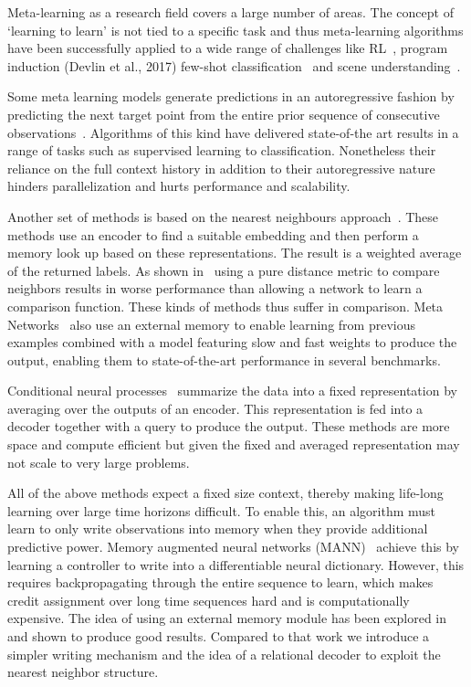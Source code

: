 \documentclass{article} \usepackage{iclr2019_conference,times}
\begin{document}
Meta-learning as a research field covers a large number of areas. The concept of ‘learning to learn’ is not tied to a specific task and thus meta-learning algorithms have been successfully applied to a wide range of challenges like RL~\citep{wang2016learning, finn2017model}, program induction (Devlin et al., 2017) few-shot classification~\citep{koch2015siamese, vinyals2016matching} and scene understanding~\citep{eslami2018neural}.

Some meta learning models generate predictions in an autoregressive fashion by predicting the next target point from the entire prior sequence of consecutive observations~\citep{reed2018fewshot, mishra2018a}. Algorithms of this kind have delivered state-of-the art results in a range of tasks such as supervised learning to classification. Nonetheless their reliance on the full context history in addition to their autoregressive nature hinders parallelization and hurts performance and scalability.

Another set of methods is based on the nearest neighbours approach~\citep{koch2015siamese, vinyals2016matching, snell2017prototypical}. These methods use an encoder to find a suitable embedding and then perform a memory look up based on these representations. The result is a weighted average of the returned labels. As shown in~\citep{mishra2018a} using a pure distance metric to compare neighbors results in worse performance than allowing a network to learn a comparison function. These kinds of methods thus suffer in comparison. Meta Networks~\citep{munkhdalai2017meta} also use an external memory to enable learning from previous examples combined with a model featuring slow and fast weights to produce the output, enabling them to state-of-the-art performance in several benchmarks.  

Conditional neural processes~\citep{garnelo2018conditional} summarize the data into a fixed representation by averaging over the outputs of an encoder. This representation is fed into a decoder together with a query to produce the output. These methods are more space and compute efficient but given the fixed and averaged representation may not scale to very large problems.

All of the above methods expect a fixed size context, thereby making life-long learning over large time horizons difficult. To enable this, an algorithm must learn to only write observations into memory when they provide additional predictive power. Memory augmented neural networks (MANN)~\citep{santoro2016meta} achieve this by learning a controller to write into a differentiable neural dictionary. However, this requires backpropagating through the entire sequence to learn, which makes credit assignment over long time sequences hard and is computationally expensive. The idea of using an external memory module has been explored in~\citep{kaiser2017learning} and shown to produce good results. Compared to that work we introduce a simpler writing mechanism and the idea of a relational decoder to exploit the nearest neighbor structure.  
\end{document}
